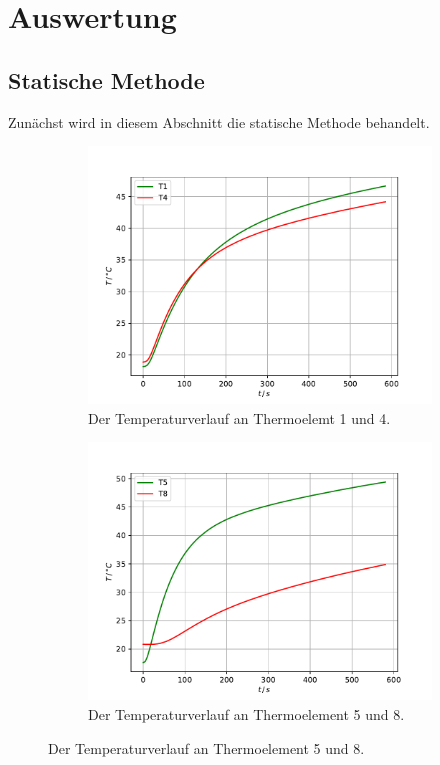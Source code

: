 \section{Auswertung}
\label{sec:Auswertung}

\subsection{Statische Methode}
Zunächst wird in diesem Abschnitt die statische Methode behandelt.

\begin{figure}
    \centering
    \caption{Vier Temperaturverläufe von unterschiedlichen Materialien.}
    \begin{subfigure}{\textwidth/2}
        \centering
        \includegraphics[width=\textwidth]{content/data/statsisch_T1_T4.pdf}
        \caption{Der Temperaturverlauf an Thermoelemt 1 und 4.}
        \label{fig:stat_1_4}
    \end{subfigure}
    \begin{subfigure}{\textwidth/2}
        \centering
        \includegraphics[width=\textwidth]{content/data/statsisch_T5_T8.pdf}
        \caption{Der Temperaturverlauf an Thermoelement 5 und 8.}
        \label{fig:stat_5_8}
    \end{subfigure}
    \label{fig:stat}
\end{figure}

